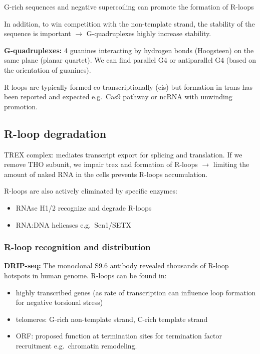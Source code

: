 G-rich sequences and negative supercoiling can promote the formation of R-loops

In addition, to win competition with the non-template strand, the stability of the sequence is important $\rightarrow$ G-quadruplexes highly increase stability.

\textbf{G-quadruplexes:} 4 guanines interacting by hydrogen bonds (Hoogsteen) on the same plane (planar quartet). We can find parallel G4 or antiparallel G4 (based on the orientation of guanines).

R-loops are typically formed co-transcriptionally (cis) but formation in trans has been reported and expected e.g.~Cas9 pathway or ncRNA with unwinding promotion.

\hypertarget{r-loop-degradation}{%
\subsection{R-loop degradation}\label{r-loop-degradation}}

TREX complex: mediates transcript export for splicing and translation. If we remove THO subunit, we impair trex and formation of R-loops $\rightarrow$ limiting the amount of naked RNA in the cells prevents R-loops accumulation.

R-loops are also actively eliminated by specific enzymes:

\begin{itemize}
\tightlist
\item
  RNAse H1/2 recognize and degrade R-loops
\item
  RNA:DNA helicases e.g.~Sen1/SETX
\end{itemize}

\hypertarget{r-loop-recognition-and-distribution}{%
\subsubsection{R-loop recognition and distribution}\label{r-loop-recognition-and-distribution}}

\textbf{DRIP-seq:} The monoclonal S9.6 antibody revealed thousands of R-loop hotspots in human genome. R-loops can be found in:

\begin{itemize}
\tightlist
\item
  highly transcribed genes (as rate of transcription can influence loop formation for negative torsional stress)
\item
  telomeres: G-rich non-template strand, C-rich template strand
\item
  ORF: proposed function at termination sites for termination factor recruitment e.g.~chromatin remodeling.
\end{itemize}

